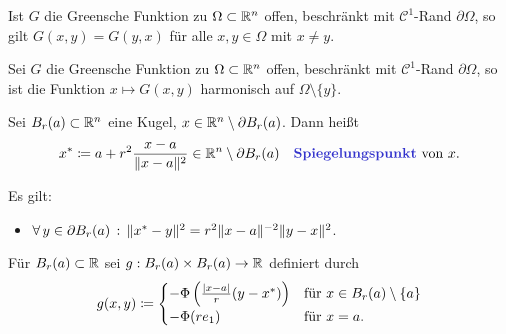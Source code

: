 \documentclass{cheat-sheet}
\begin{document}
\begin{satz} %
  Ist $G$ die Greensche Funktion zu $\Omega \subset \mathbb{R}^n$ offen, beschränkt mit $\mathcal{C}^1$-Rand $\partial \Omega$, so gilt $G(x, y) = G(y, x)$ für alle $x, y \in \Omega$ mit $x \not= y$.
\end{satz}

\begin{kor}
  Sei $G$ die Greensche Funktion zu $\Omega \subset \mathbb{R}^n$ offen, beschränkt mit $\mathcal{C}^1$-Rand $\partial \Omega$, so ist die Funktion $x \mapsto G(x, y)$ harmonisch auf $\Omega \setminus \{ y \}$.
\end{kor}

\begin{defn}
  Sei $B_r(a) \subset \mathbb{R}^n$ eine Kugel, $x \in \mathbb{R}^n \setminus \partial B_r(a)$. Dann heißt
  \[
    x^* \coloneqq a + r^2 \frac{x - a}{\norm{x - a}^2} \in \R^n \setminus \partial B_r(a) \quad
    \text{\emph{Spiegelungspunkt} von $x$.}
  \]
\end{defn}

\begin{bem}
  \begin{minipage}{0.12 \linewidth}Es gilt:\end{minipage}
  \begin{minipage}{0.63 \linewidth}
    \begin{itemize}
    \end{itemize}
  \end{minipage}
  \begin{itemize}
    \item $\forall \, {y \in \partial B_r(a)} \,:\, \lVert x^* - y\rVert^2 = r^2 \lVert x - a\rVert^{-2} \lVert y - x\rVert^2$.
  \end{itemize}
\end{bem}

\begin{nota}
  Für $B_r(a) \subset \mathbb{R}$ sei $g : B_r(a) \times B_r(a) \to \mathbb{R}$ definiert durch
  \[ g(x, y) \coloneqq \begin{cases}
      - \Phi\left( \tfrac{\lvert x-a\rvert}{r} (y - x^*) \right) & \text{für $x \in B_r(a) \setminus \{ a \}$}\\
      - \Phi(r e_1) & \text{für $x = a$.}
    \end{cases}
  \]
\end{nota}
\end{document}
